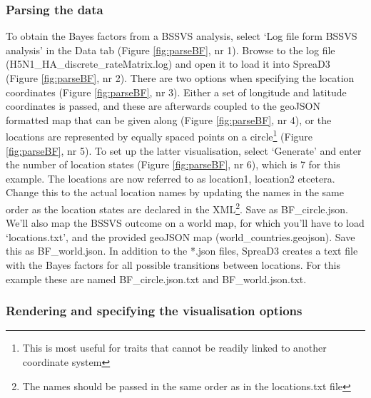 \documentclass[english]{paper}
\begin{document}
\subsubsection{Parsing the data}

To obtain the Bayes factors from a BSSVS analysis, select `Log file form BSSVS analysis' in the Data tab (Figure \ref{fig:parseBF}, nr 1).
Browse to the log file (H5N1\_HA\_discrete\_rateMatrix.log) and open it to load it into SpreaD3 (Figure \ref{fig:parseBF}, nr 2).
There are two options when specifying the location coordinates (Figure \ref{fig:parseBF}, nr 3).
Either a set of longitude and latitude coordinates is passed, and these are afterwards coupled to the geoJSON formatted map that can be given along (Figure \ref{fig:parseBF}, nr 4), or the locations are represented by equally spaced points on a circle\footnote{This is most useful for traits that cannot be readily linked to another coordinate system} (Figure \ref{fig:parseBF}, nr 5).
To set up the latter visualisation, select `Generate' and enter the number of location states (Figure \ref{fig:parseBF}, nr 6), which is 7 for this example.
The locations are now referred to as location1, location2 etcetera. 
Change this to the actual location names by updating the names in the same order as the location states are declared in the XML\footnote{The names should be passed in the same order as in the locations.txt file}.
Save as BF\_circle.json.
We'll also map the BSSVS outcome on a world map, for which you'll have to load `locations.txt', and the provided geoJSON map (world\_countries.geojson).
Save this as BF\_world.json.
In addition to the *.json files, SpreaD3 creates a text file with the Bayes factors for all possible transitions between locations. 
For this example these are named BF\_circle.json.txt and BF\_world.json.txt.

\subsubsection{Rendering and specifying the visualisation options}
\end{document}
